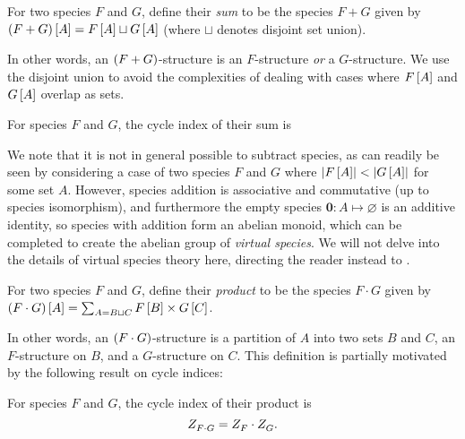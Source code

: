 \documentclass[sectionflow,singlespace,twoside,boldmathhdr,draft]{brandiss} %
\numberwithin{section}{chapter}
\numberwithin{figure}{chapter}
\begin{document}
\begin{definition}\label{def:specsum}
  For two species $F$ and $G$, define their \emph{sum} to be the species $F + G$ given by $\left( {F + G} \right) \left[ {A} \right] = F \left[ {A} \right] \sqcup G \left[ {A} \right]$ (where $\sqcup$ denotes disjoint set union).
\end{definition}
In other words, an $\left( {F + G} \right)$-structure is an $F$-structure \emph{or} a $G$-structure.
We use the disjoint union to avoid the complexities of dealing with cases where $F \left[ {A} \right]$ and $G \left[ {A} \right]$ overlap as sets.

\begin{theorem}\label{thm:specsumci}
  For species $F$ and $G$, the cycle index of their sum is
  \begin{equation}
  \end{equation}
\end{theorem}

We note that it is not in general possible to subtract species, as can readily be seen by considering a case of two species $F$ and $G$ where $\left\vert {F \ensuremath{\left[ {A} \right]}} \right\vert < \left\vert {G \ensuremath{\left[ {A} \right]}} \right\vert$ for some set $A$.
However, species addition is associative and commutative (up to species isomorphism), and furthermore the empty species $\mathbf{0}: A \mapsto \varnothing$ is an additive identity, so species with addition form an abelian monoid, which can be completed to create the abelian group of \emph{virtual species}.
We will not delve into the details of virtual species theory here, directing the reader instead to \cite[\S 2.5]{bll:species}.

\begin{definition}\label{thm:specprod}
  For two species $F$ and $G$, define their \emph{product} to be the species $F \cdot G$ given by $\left( {F \cdot G} \right) \left[ {A} \right] = \sum_{A = B \sqcup C} F \left[ {B} \right] \times G \left[ {C} \right]$.
\end{definition}
In other words, an $\left( {F \cdot G} \right)$-structure is a partition of $A$ into two sets $B$ and $C$, an $F$-structure on $B$, and a $G$-structure on $C$.
This definition is partially motivated by the following result on cycle indices:
\begin{theorem}\label{thm:specprodci}
  For species $F$ and $G$, the cycle index of their product is
  \begin{equation}
    \label{eq:specprodci}
     Z_{F \cdot G}^{}  =  Z_{F}^{}  \cdot  Z_{G}^{} .
  \end{equation}
\end{theorem}
\end{document}
